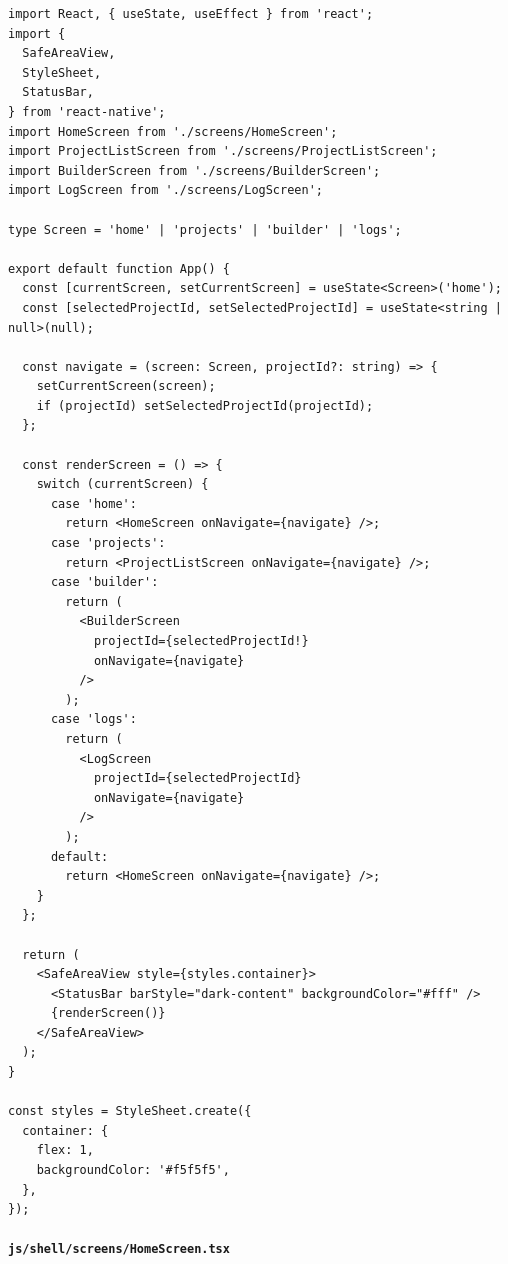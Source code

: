 \documentclass[11pt]{article}
\begin{document}
\begin{verbatim}
import React, { useState, useEffect } from 'react';
import {
  SafeAreaView,
  StyleSheet,
  StatusBar,
} from 'react-native';
import HomeScreen from './screens/HomeScreen';
import ProjectListScreen from './screens/ProjectListScreen';
import BuilderScreen from './screens/BuilderScreen';
import LogScreen from './screens/LogScreen';

type Screen = 'home' | 'projects' | 'builder' | 'logs';

export default function App() {
  const [currentScreen, setCurrentScreen] = useState<Screen>('home');
  const [selectedProjectId, setSelectedProjectId] = useState<string | null>(null);

  const navigate = (screen: Screen, projectId?: string) => {
    setCurrentScreen(screen);
    if (projectId) setSelectedProjectId(projectId);
  };

  const renderScreen = () => {
    switch (currentScreen) {
      case 'home':
        return <HomeScreen onNavigate={navigate} />;
      case 'projects':
        return <ProjectListScreen onNavigate={navigate} />;
      case 'builder':
        return (
          <BuilderScreen
            projectId={selectedProjectId!}
            onNavigate={navigate}
          />
        );
      case 'logs':
        return (
          <LogScreen
            projectId={selectedProjectId}
            onNavigate={navigate}
          />
        );
      default:
        return <HomeScreen onNavigate={navigate} />;
    }
  };

  return (
    <SafeAreaView style={styles.container}>
      <StatusBar barStyle="dark-content" backgroundColor="#fff" />
      {renderScreen()}
    </SafeAreaView>
  );
}

const styles = StyleSheet.create({
  container: {
    flex: 1,
    backgroundColor: '#f5f5f5',
  },
});
\end{verbatim}

\paragraph{\texttt{js/shell/screens/HomeScreen.tsx}}
\end{document}
